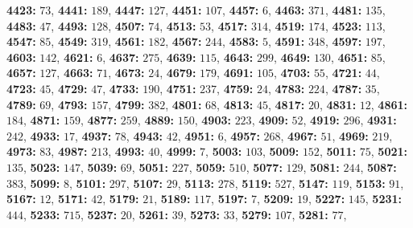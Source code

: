 \textsf{\bfseries 4423:} $73$, \textsf{\bfseries 4441:} $189$, \textsf{\bfseries 4447:} $127$, \textsf{\bfseries 4451:} $107$, \textsf{\bfseries 4457:} $6$, \textsf{\bfseries 4463:} $371$, \textsf{\bfseries 4481:} $135$, \textsf{\bfseries 4483:} $47$, \textsf{\bfseries 4493:} $128$, \textsf{\bfseries 4507:} $74$, \textsf{\bfseries 4513:} $53$, \textsf{\bfseries 4517:} $314$, \textsf{\bfseries 4519:} $174$, \textsf{\bfseries 4523:} $113$, \textsf{\bfseries 4547:} $85$, \textsf{\bfseries 4549:} $319$, \textsf{\bfseries 4561:} $182$, \textsf{\bfseries 4567:} $244$, \textsf{\bfseries 4583:} $5$, \textsf{\bfseries 4591:} $348$, \textsf{\bfseries 4597:} $197$, \textsf{\bfseries 4603:} $142$, \textsf{\bfseries 4621:} $6$, \textsf{\bfseries 4637:} $275$, \textsf{\bfseries 4639:} $115$, \textsf{\bfseries 4643:} $299$, \textsf{\bfseries 4649:} $130$, \textsf{\bfseries 4651:} $85$, \textsf{\bfseries 4657:} $127$, \textsf{\bfseries 4663:} $71$, \textsf{\bfseries 4673:} $24$, \textsf{\bfseries 4679:} $179$, \textsf{\bfseries 4691:} $105$, \textsf{\bfseries 4703:} $55$, \textsf{\bfseries 4721:} $44$, \textsf{\bfseries 4723:} $45$, \textsf{\bfseries 4729:} $47$, \textsf{\bfseries 4733:} $190$, \textsf{\bfseries 4751:} $237$, \textsf{\bfseries 4759:} $24$, \textsf{\bfseries 4783:} $224$, \textsf{\bfseries 4787:} $35$, \textsf{\bfseries 4789:} $69$, \textsf{\bfseries 4793:} $157$, \textsf{\bfseries 4799:} $382$, \textsf{\bfseries 4801:} $68$, \textsf{\bfseries 4813:} $45$, \textsf{\bfseries 4817:} $20$, \textsf{\bfseries 4831:} $12$, \textsf{\bfseries 4861:} $184$, \textsf{\bfseries 4871:} $159$, \textsf{\bfseries 4877:} $259$, \textsf{\bfseries 4889:} $150$, \textsf{\bfseries 4903:} $223$, \textsf{\bfseries 4909:} $52$, \textsf{\bfseries 4919:} $296$, \textsf{\bfseries 4931:} $242$, \textsf{\bfseries 4933:} $17$, \textsf{\bfseries 4937:} $78$, \textsf{\bfseries 4943:} $42$, \textsf{\bfseries 4951:} $6$, \textsf{\bfseries 4957:} $268$, \textsf{\bfseries 4967:} $51$, \textsf{\bfseries 4969:} $219$, \textsf{\bfseries 4973:} $83$, \textsf{\bfseries 4987:} $213$, \textsf{\bfseries 4993:} $40$, \textsf{\bfseries 4999:} $7$, \textsf{\bfseries 5003:} $103$, \textsf{\bfseries 5009:} $152$, \textsf{\bfseries 5011:} $75$, \textsf{\bfseries 5021:} $135$, \textsf{\bfseries 5023:} $147$, \textsf{\bfseries 5039:} $69$, \textsf{\bfseries 5051:} $227$, \textsf{\bfseries 5059:} $510$, \textsf{\bfseries 5077:} $129$, \textsf{\bfseries 5081:} $244$, \textsf{\bfseries 5087:} $383$, \textsf{\bfseries 5099:} $8$, \textsf{\bfseries 5101:} $297$, \textsf{\bfseries 5107:} $29$, \textsf{\bfseries 5113:} $278$, \textsf{\bfseries 5119:} $527$, \textsf{\bfseries 5147:} $119$, \textsf{\bfseries 5153:} $91$, \textsf{\bfseries 5167:} $12$, \textsf{\bfseries 5171:} $42$, \textsf{\bfseries 5179:} $21$, \textsf{\bfseries 5189:} $117$, \textsf{\bfseries 5197:} $7$, \textsf{\bfseries 5209:} $19$, \textsf{\bfseries 5227:} $145$, \textsf{\bfseries 5231:} $444$, \textsf{\bfseries 5233:} $715$, \textsf{\bfseries 5237:} $20$, \textsf{\bfseries 5261:} $39$, \textsf{\bfseries 5273:} $33$, \textsf{\bfseries 5279:} $107$, \textsf{\bfseries 5281:} $77$, 
